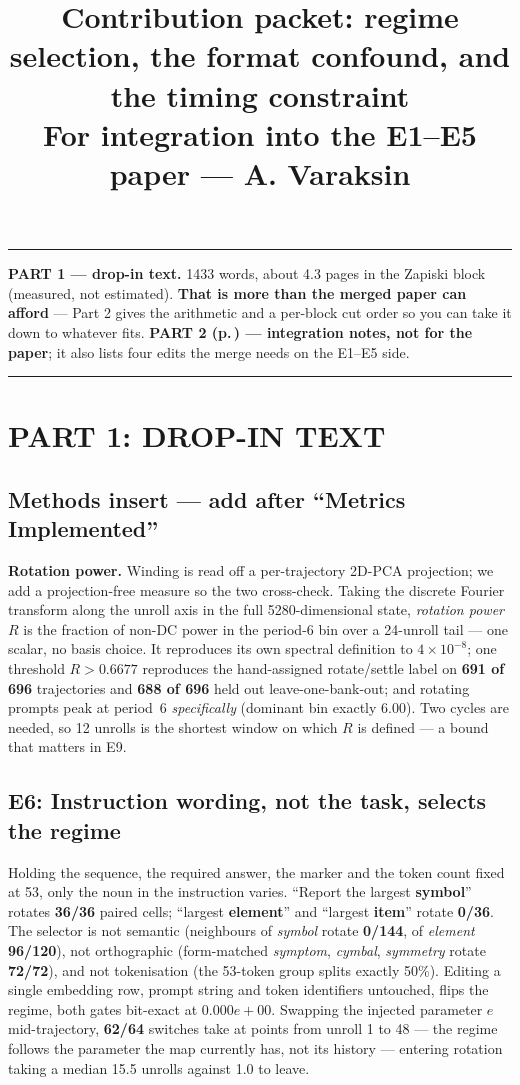 \documentclass[11pt,a4paper]{article}
\title{\vspace{-1.6cm}Contribution packet: regime selection, the format confound,
and the timing constraint\\[2pt]
\large For integration into the E1--E5 paper --- A. Varaksin}
\date{}
\begin{document}
\maketitle
\vspace{-1.2cm}

\noindent\rule{\linewidth}{0.8pt}
\textbf{PART 1 --- drop-in text.} 1433 words, about 4.3 pages in the Zapiski block (measured, not
estimated). \textbf{That is more than the merged paper can afford} --- Part 2 gives the arithmetic
and a per-block cut order so you can take it down to whatever fits.
\textbf{PART 2 (p.\,\pageref{sec:notes}) --- integration notes, not for the paper}; it also lists
four edits the merge needs on the E1--E5 side.
\rule{\linewidth}{0.8pt}

\section*{PART 1: DROP-IN TEXT}

\subsection*{Methods insert --- add after ``Metrics Implemented''}

\textbf{Rotation power.} Winding is read off a per-trajectory 2D-PCA projection; we add a
projection-free measure so the two cross-check. Taking the discrete Fourier transform along the
unroll axis in the full 5280-dimensional state, \emph{rotation power} $R$ is the fraction of
non-DC power in the period-6 bin over a 24-unroll tail --- one scalar, no basis choice. It
reproduces its own spectral definition to $4\times10^{-8}$; one threshold $R > 0.6677$ reproduces
the hand-assigned rotate/settle label on \textbf{691 of 696} trajectories and \textbf{688 of 696}
held out leave-one-bank-out; and rotating prompts peak at period~6 \emph{specifically} (dominant
bin exactly $6.00$). Two cycles are needed, so 12 unrolls is the shortest window on which $R$ is
defined --- a bound that matters in E9.

\subsection*{E6: Instruction wording, not the task, selects the regime}

Holding the sequence, the required answer, the marker and the token count fixed at 53, only the
noun in the instruction varies. ``Report the largest \textbf{symbol}'' rotates \textbf{36/36}
paired cells; ``largest \textbf{element}'' and ``largest \textbf{item}'' rotate \textbf{0/36}. The
selector is not semantic (neighbours of \emph{symbol} rotate \textbf{0/144}, of \emph{element}
\textbf{96/120}), not orthographic (form-matched \emph{symptom}, \emph{cymbal}, \emph{symmetry}
rotate \textbf{72/72}), and not tokenisation (the 53-token group splits exactly 50\%). Editing a
single embedding row, prompt string and token identifiers untouched, flips the regime, both gates
bit-exact at $0.000e{+}00$. Swapping the injected parameter $e$ mid-trajectory, \textbf{62/64}
switches take at points from unroll 1 to 48 --- the regime follows the parameter the map currently
has, not its history --- entering rotation taking a median 15.5 unrolls against 1.0 to leave.
\end{document}
